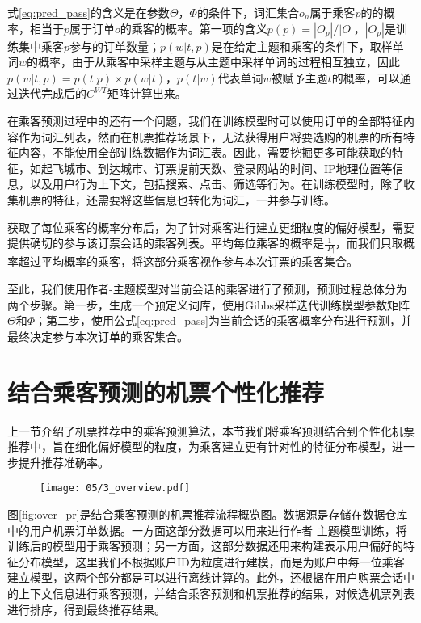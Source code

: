式\ref{eq:pred_pass}的含义是在参数$\Theta$，$\Phi$的条件下，词汇集合$o_n$属于乘客$p$的的概率，相当于$p$属于订单$o$的乘客的概率。第一项的含义$p(p) = |O_p| / |O|$，$|O_p|$是训练集中乘客$p$参与的订单数量；$p(w|t,p)$是在给定主题和乘客的条件下，取样单词$w$的概率，由于从乘客中采样主题与从主题中采样单词的过程相互独立，因此$p(w|t,p) = p(t|p) \times p(w|t)$，$p(t|w)$代表单词$w$被赋予主题$t$的概率，可以通过迭代完成后的$C^{WT}$矩阵计算出来。

在乘客预测过程中的还有一个问题，我们在训练模型时可以使用订单的全部特征内容作为词汇列表，然而在机票推荐场景下，无法获得用户将要选购的机票的所有特征内容，不能使用全部训练数据作为词汇表。因此，需要挖掘更多可能获取的特征，如起飞城市、到达城市、订票提前天数、登录网站的时间、IP地理位置等信息，以及用户行为上下文，包括搜索、点击、筛选等行为。在训练模型时，除了收集机票的特征，还需要将这些信息也转化为词汇，一并参与训练。

获取了每位乘客的概率分布后，为了针对乘客进行建立更细粒度的偏好模型，需要提供确切的参与该订票会话的乘客列表。平均每位乘客的概率是$\frac{1}{|P|}$，而我们只取概率超过平均概率的乘客，将这部分乘客视作参与本次订票的乘客集合。

至此，我们使用作者-主题模型对当前会话的乘客进行了预测，预测过程总体分为两个步骤。第一步，生成一个预定义词库，使用Gibbs采样迭代训练模型参数矩阵$\Theta$和$\Phi$；第二步，使用公式\ref{eq:pred_pass}为当前会话的乘客概率分布进行预测，并最终决定参与本次订单的乘客集合。

\section{结合乘客预测的机票个性化推荐}
上一节介绍了机票推荐中的乘客预测算法，本节我们将乘客预测结合到个性化机票推荐中，旨在细化偏好模型的粒度，为乘客建立更有针对性的特征分布模型，进一步提升推荐准确率。

\begin{figure}
 \centering
 \texttt{[image: 05/3\_overview.pdf]}
\end{figure}

图\ref{fig:over_pr}是结合乘客预测的机票推荐流程概览图。数据源是存储在数据仓库中的用户机票订单数据。一方面这部分数据可以用来进行作者-主题模型训练，将训练后的模型用于乘客预测；另一方面，这部分数据还用来构建表示用户偏好的特征分布模型，这里我们不根据账户ID为粒度进行建模，而是为账户中每一位乘客建立模型，这两个部分都是可以进行离线计算的。此外，还根据在用户购票会话中的上下文信息进行乘客预测，并结合乘客预测和机票推荐的结果，对候选机票列表进行排序，得到最终推荐结果。

